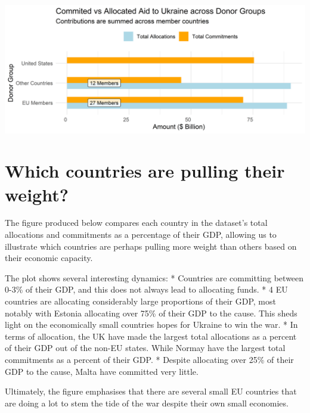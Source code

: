 \documentclass[11pt,preprint, authoryear]{elsarticle}
\let\origfigure\figure
\let\endorigfigure\endfigure
\renewenvironment{figure}[1][2] {
    \expandafter\origfigure\expandafter[H]
} {
    \endorigfigure
}
\numberwithin{equation}{section}
\numberwithin{figure}{section}
\numberwithin{table}{section}
\begin{document}
\begin{figure}[H]

{\centering \includegraphics{Question_3_files/figure-latex/Figure1-1} 

}

\caption{EU Allocations \label{Figure1}}\label{fig:Figure1}
\end{figure}

\hypertarget{which-countries-are-pulling-their-weight}{%
\section{\texorpdfstring{Which countries are pulling their weight?
\label{vsGDP}}{Which countries are pulling their weight? }}\label{which-countries-are-pulling-their-weight}}

The figure produced below compares each country in the dataset's total
allocations and commitments as a percentage of their GDP, allowing us to
illustrate which countries are perhaps pulling more weight than others
based on their economic capacity.

The plot shows several interesting dynamics: * Countries are committing
between 0-3\% of their GDP, and this does not always lead to allocating
funds. * 4 EU countries are allocating considerably large proportions of
their GDP, most notably with Estonia allocating over 75\% of their GDP
to the cause. This sheds light on the economically small countries hopes
for Ukraine to win the war. * In terms of allocation, the UK have made
the largest total allocations as a percent of their GDP out of the
non-EU states. While Normay have the largest total commitments as a
percent of their GDP. * Despite allocating over 25\% of their GDP to the
cause, Malta have committed very little.

Ultimately, the figure emphasises that there are several small EU
countries that are doing a lot to stem the tide of the war despite their
own small economies.
\end{document}
